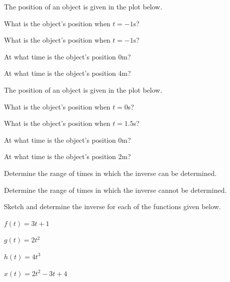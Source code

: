 \begin{problem}
\item The position of an object is given in the plot below.

  \scalebox{0.55}{}

  \begin{subproblem}
    \item What is the object's position when $t=-1$s?
      \vfill

    \item What is the object's position when $t=-1$s?
      \vfill

    \item At what time is the object's position 0m?
      \vfill

    \item At what time is the object's position 4m?
      \vfill

  \end{subproblem}

  \clearpage

\item The position of an object is given in the plot below.

  \scalebox{0.55}{}

  \begin{subproblem}
    \item What is the object's position when $t=0$s?
      \vfill

    \item What is the object's position when $t=1.5$s?
      \vfill

    \item At what time is the object's position 0m?
      \vfill

    \item At what time is the object's position 2m?
      \vfill

    \item Determine the range of times in which the inverse can be
      determined.
      \vfill

    \item Determine the range of times in which the inverse cannot be
      determined.
      \vfill

  \end{subproblem}

  \clearpage

\item Sketch and determine the inverse for each of the functions given
  below.

  \begin{subproblem}
  \item $f(t)=3t+1$
    \vfill
  \item $g(t)=2t^2$
    \vfill
  \item $h(t)=4t^3$
    \vfill
  \item $x(t)=2t^2 - 3t + 4$
    \vfill
  \end{subproblem}

\end{problem}

